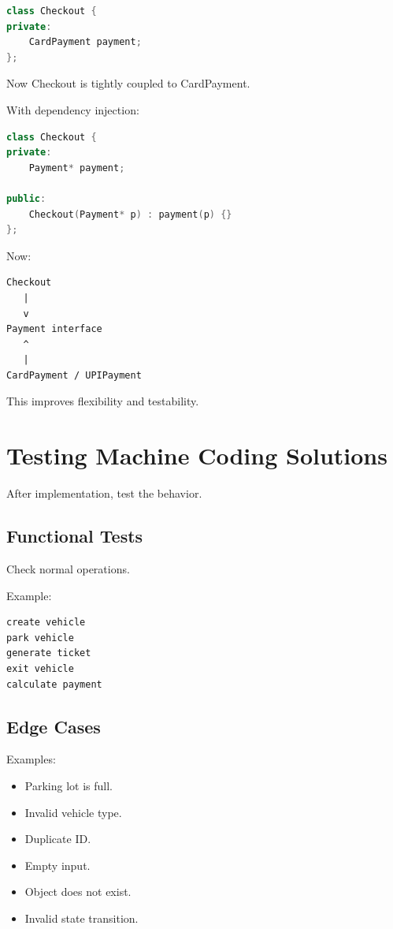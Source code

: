 \documentclass[12pt,a4paper]{article}
\begin{document}
\begin{lstlisting}[language=C++]
class Checkout {
private:
    CardPayment payment;
};
\end{lstlisting}

Now Checkout is tightly coupled to CardPayment.

With dependency injection:

\begin{lstlisting}[language=C++]
class Checkout {
private:
    Payment* payment;

public:
    Checkout(Payment* p) : payment(p) {}
};
\end{lstlisting}

Now:

\begin{verbatim}
Checkout
   |
   v
Payment interface
   ^
   |
CardPayment / UPIPayment
\end{verbatim}

This improves flexibility and testability.

\section{Testing Machine Coding Solutions}

After implementation, test the behavior.

\subsection{Functional Tests}

Check normal operations.

Example:

\begin{verbatim}
create vehicle
park vehicle
generate ticket
exit vehicle
calculate payment
\end{verbatim}

\subsection{Edge Cases}

Examples:

\begin{itemize}
\item Parking lot is full.
\item Invalid vehicle type.
\item Duplicate ID.
\item Empty input.
\item Object does not exist.
\item Invalid state transition.
\end{itemize}
\end{document}
